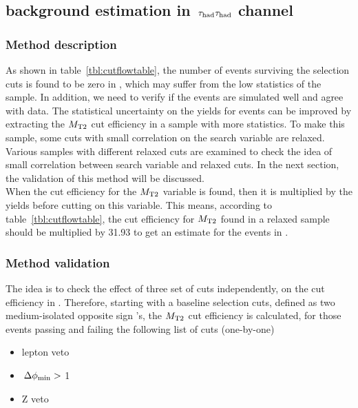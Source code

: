\subsection{\texorpdfstring{\wjets background estimation in $\,\tau_{\rm had}\tau_{\rm had}$ channel}{Wjets background estimation in tau-tau channel}}
\label{sect:bkgW}
\subsubsection{Method description}
As shown in table~\ref{tbl:cutflowtable}, the number of \wjets events surviving 
the selection cuts is found to be zero in \binone, which may suffer from the low statistics of the \wjets sample. In addition, we need to verify if the \wjets events are simulated well and agree with data.
 The statistical uncertainty on the yields for \wjets events can be improved by extracting 
the ${M_{\rm T2}}$ cut efficiency in a sample with more statistics. To make this sample, some cuts with small correlation on the search variable are 
relaxed. Various samples with different relaxed cuts are examined to check the idea of small correlation 
between search variable and relaxed cuts. In the next section, the validation of this method will be discussed.\\
When the cut efficiency for the ${M_{\rm T2}}$ variable is found, then it is multiplied by the \wjets 
yields before cutting on this variable. This means, according to table~\ref{tbl:cutflowtable}, the cut efficiency for 
${M_{\rm T2}}$ found in a relaxed sample should be multiplied by 31.93 to get an 
estimate for the \wjets events in  \binone.\\

\subsubsection{Method validation}
The idea is to check the effect of three set of cuts independently, 
on the \mttwo cut efficiency in  \binone. 
Therefore, starting with a baseline selection cuts, defined as two 
medium-isolated opposite sign \Tau's, the ${M_{\rm T2}}$ cut 
efficiency is calculated, for those events passing and failing the following list of cuts (one-by-one)
\begin{itemize}
\item lepton veto
\item $\,{\Delta\phi_{\rm min}}>$ 1
\item Z veto 
\end{itemize}


